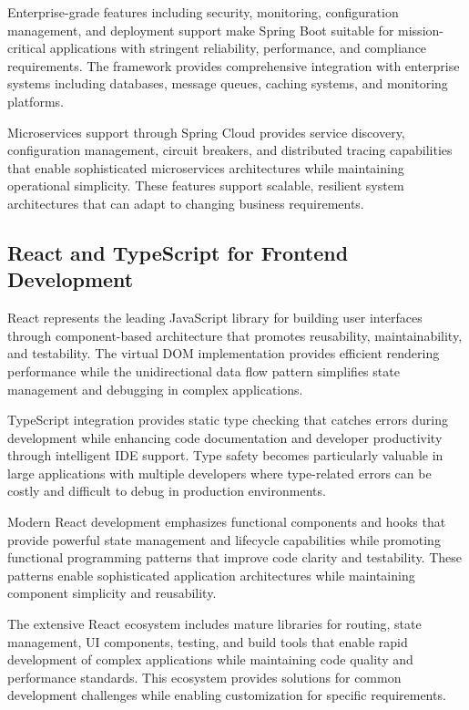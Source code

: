Enterprise-grade features including security, monitoring, configuration management, and deployment support make Spring Boot suitable for mission-critical applications with stringent reliability, performance, and compliance requirements. The framework provides comprehensive integration with enterprise systems including databases, message queues, caching systems, and monitoring platforms.

Microservices support through Spring Cloud provides service discovery, configuration management, circuit breakers, and distributed tracing capabilities that enable sophisticated microservices architectures while maintaining operational simplicity. These features support scalable, resilient system architectures that can adapt to changing business requirements.

\subsection{React and TypeScript for Frontend Development}

React represents the leading JavaScript library for building user interfaces through component-based architecture that promotes reusability, maintainability, and testability. The virtual DOM implementation provides efficient rendering performance while the unidirectional data flow pattern simplifies state management and debugging in complex applications.

TypeScript integration provides static type checking that catches errors during development while enhancing code documentation and developer productivity through intelligent IDE support. Type safety becomes particularly valuable in large applications with multiple developers where type-related errors can be costly and difficult to debug in production environments.

Modern React development emphasizes functional components and hooks that provide powerful state management and lifecycle capabilities while promoting functional programming patterns that improve code clarity and testability. These patterns enable sophisticated application architectures while maintaining component simplicity and reusability.

The extensive React ecosystem includes mature libraries for routing, state management, UI components, testing, and build tools that enable rapid development of complex applications while maintaining code quality and performance standards. This ecosystem provides solutions for common development challenges while enabling customization for specific requirements.

